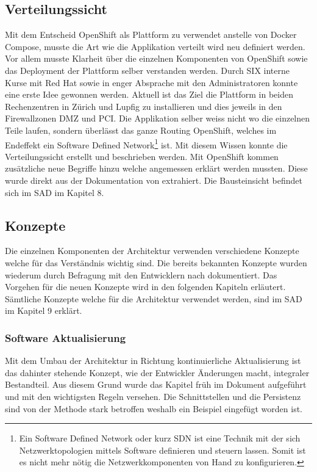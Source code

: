 \subsection{Verteilungssicht}

Mit dem Entscheid OpenShift als Plattform zu verwendet anstelle von Docker Compose, musste die Art wie die Applikation verteilt wird neu definiert werden. Vor allem musste Klarheit über die einzelnen Komponenten von OpenShift sowie das Deployment der Plattform selber verstanden werden. Durch SIX interne Kurse mit Red Hat sowie in enger Absprache mit den Administratoren konnte eine erste Idee gewonnen werden. Aktuell ist das Ziel die Plattform in beiden Rechenzentren in Zürich und Lupfig zu installieren und dies jeweils in den Firewallzonen DMZ und PCI. Die Applikation selber weiss nicht wo die einzelnen Teile laufen, sondern überlässt das ganze Routing OpenShift, welches im Endeffekt ein Software Defined Network\footnote{Ein Software Defined Network oder kurz SDN ist eine Technik mit der sich Netzwerktopologien mittels Software definieren und steuern lassen. Somit ist es nicht mehr nötig die Netzwerkkomponenten von Hand zu konfigurieren. } ist. Mit diesem Wissen konnte die Verteilungssicht erstellt und beschrieben werden. Mit OpenShift kommen zusätzliche neue Begriffe hinzu welche angemessen erklärt werden mussten. Diese wurde direkt aus der Dokumentation von \cite{osservicepod} extrahiert. Die Bausteinsicht befindet sich im SAD im Kapitel 8.

\subsection{Konzepte}

Die einzelnen Komponenten der Architektur verwenden verschiedene Konzepte welche für das Verständnis wichtig sind. Die bereits bekannten Konzepte wurden wiederum durch Befragung mit den Entwicklern nach dokumentiert. Das Vorgehen für die neuen Konzepte wird in den folgenden Kapiteln erläutert. Sämtliche Konzepte welche für die Architektur verwendet werden, sind im SAD im Kapitel 9 erklärt.

\subsubsection{Software Aktualisierung}

Mit dem Umbau der Architektur in Richtung kontinuierliche Aktualisierung ist das dahinter stehende Konzept, wie der Entwickler Änderungen macht, integraler Bestandteil. Aus diesem Grund wurde das Kapitel früh im Dokument aufgeführt und mit den wichtigsten Regeln versehen. Die Schnittstellen und die Persistenz sind von der Methode stark betroffen weshalb ein Beispiel eingefügt worden ist.

